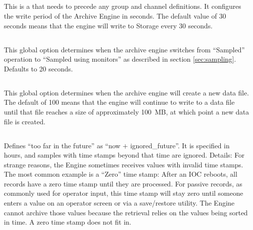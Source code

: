 



\clearpage

\subsection{}
This is a  that needs to precede any group and
channel definitions.  It configures the write period of the Archive
Engine in seconds. The default value of 30 seconds means that the
engine will write to Storage every 30 seconds.

\subsection{} \label{sec:getthreshold}
This global option determines when the archive engine switches from
``Sampled'' operation to ``Sampled using monitors'' as described in
section \ref{sec:sampling}. Defaults to 20 seconds.

\subsection{}
This global option determines when the archive engine will create a
new data file. The default of 100 means that the engine will continue
to write to a data file until that file reaches a size of
approximately 100~MB, at which point a new data file is created.

\subsection{}
Defines ``too far in the future'' as ``now $+$ ignored\_future''. It
is specified in hours, and samples with time stamps beyond that time
are ignored.
Details: For strange reasons, the Engine sometimes receives values with invalid
time stamps. The most common example is a ``Zero'' time stamp: After
an IOC reboots, all records have a zero time stamp until they are
processed. For passive records, as commonly used for operator input,
this time stamp will stay zero until someone enters a value on an
operator screen or via a save/restore utility. The Engine cannot
archive those values because the retrieval relies on the values being
sorted in time. A zero time stamp does not fit in.

